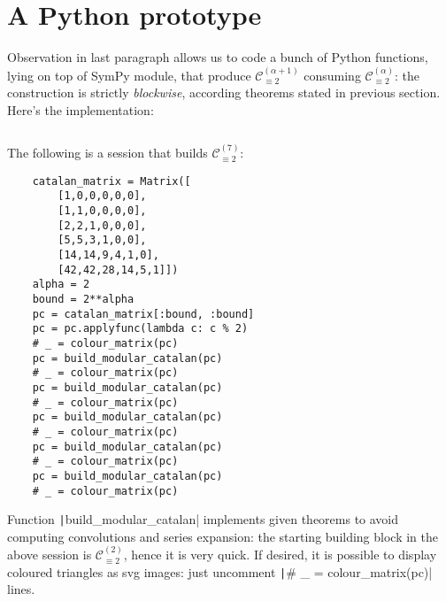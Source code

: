 
\appendix

\section{A Python prototype}

Observation in last paragraph allows us to code a bunch of Python functions, 
lying on top of SymPy module, that produce 
$\mathcal{C}_{\equiv 2}^{(\alpha+1)}$ consuming $\mathcal{C}_{\equiv 2}^{(\alpha)}$:
the construction is strictly \emph{blockwise}, according theorems stated
in previous section. Here's the implementation:

\begin{adjustwidth}{-1cm}{0cm}
    \inputminted{python}{../../PhD/projects/recurrences-unfolding/sympy-notebook/colouring.py}
\end{adjustwidth}

The following is a session that builds $\mathcal{C}_{\equiv 2}^{(7)}$:
\begin{verbatim}
    catalan_matrix = Matrix([
        [1,0,0,0,0,0], 
        [1,1,0,0,0,0], 
        [2,2,1,0,0,0], 
        [5,5,3,1,0,0], 
        [14,14,9,4,1,0], 
        [42,42,28,14,5,1]])
    alpha = 2
    bound = 2**alpha
    pc = catalan_matrix[:bound, :bound]
    pc = pc.applyfunc(lambda c: c % 2)
    # _ = colour_matrix(pc)
    pc = build_modular_catalan(pc)
    # _ = colour_matrix(pc)
    pc = build_modular_catalan(pc)
    # _ = colour_matrix(pc)
    pc = build_modular_catalan(pc)
    # _ = colour_matrix(pc)
    pc = build_modular_catalan(pc)
    # _ = colour_matrix(pc)
    pc = build_modular_catalan(pc)
    # _ = colour_matrix(pc)
\end{verbatim}

Function \texttt|build_modular_catalan| implements given theorems to avoid
computing convolutions and series expansion: the starting building block in the 
above session is $\mathcal{C}_{\equiv 2}^{(2)}$, hence it is very quick. 
If desired, it is possible to display coloured triangles as svg images:
just uncomment \texttt|# _ = colour_matrix(pc)| lines.
